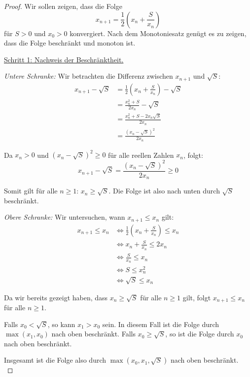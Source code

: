 \documentclass{article}
\begin{document}
\begin{proof}
    Wir sollen zeigen, dass die Folge
    $$x_{n+1} = \frac{1}{2}\left(x_n + \frac{S}{x_n}\right)$$
    für $S > 0$ und $x_0 > 0$ konvergiert. Nach dem Monotoniesatz genügt es zu zeigen, dass die Folge beschränkt und monoton ist.
    
    \underline{Schritt 1: Nachweis der Beschränktheit.}
    
    \textit{Untere Schranke:} 
    Wir betrachten die Differenz zwischen $x_{n+1}$ und $\sqrt{S}$:
    \begin{align*}
    x_{n+1} - \sqrt{S} &= \frac{1}{2}\left(x_n + \frac{S}{x_n}\right) - \sqrt{S} \\
    &= \frac{x_n^2 + S}{2x_n} - \sqrt{S} \\
    &= \frac{x_n^2 + S - 2x_n\sqrt{S}}{2x_n} \\
    &= \frac{(x_n - \sqrt{S})^2}{2x_n}
    \end{align*}
    
    Da $x_n > 0$ und $(x_n - \sqrt{S})^2 \geq 0$ für alle reellen Zahlen $x_n$, folgt:
    $$x_{n+1} - \sqrt{S} = \frac{(x_n - \sqrt{S})^2}{2x_n} \geq 0$$
    
    Somit gilt für alle $n \geq 1$: $x_n \geq \sqrt{S}$. Die Folge ist also nach unten durch $\sqrt{S}$ beschränkt.
    
    \textit{Obere Schranke:}
    Wir untersuchen, wann $x_{n+1} \leq x_n$ gilt:
    \begin{align*}
    x_{n+1} \leq x_n &\iff \frac{1}{2}\left(x_n + \frac{S}{x_n}\right) \leq x_n \\
    &\iff x_n + \frac{S}{x_n} \leq 2x_n \\
    &\iff \frac{S}{x_n} \leq x_n \\
    &\iff S \leq x_n^2 \\
    &\iff \sqrt{S} \leq x_n
    \end{align*}
    
    Da wir bereits gezeigt haben, dass $x_n \geq \sqrt{S}$ für alle $n \geq 1$ gilt, folgt $x_{n+1} \leq x_n$ für alle $n \geq 1$.
    
    Falls $x_0 < \sqrt{S}$, so kann $x_1 > x_0$ sein. In diesem Fall ist die Folge durch $\max(x_1, x_0)$ nach oben beschränkt.
    Falls $x_0 \geq \sqrt{S}$, so ist die Folge durch $x_0$ nach oben beschränkt.
    
    Insgesamt ist die Folge also durch $\max(x_0, x_1, \sqrt{S})$ nach oben beschränkt.\\
    

\end{proof}
\end{document}

